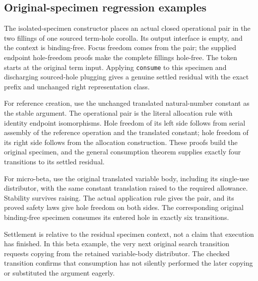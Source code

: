 \subsection{Original-specimen regression examples}
The isolated-specimen constructor places an actual closed operational pair
in the two fillings of one sourced term-hole corolla. Its output interface
is empty, and the context is binding-free. Focus freedom comes from the
pair; the supplied endpoint hole-freedom proofs make the complete fillings
hole-free. The token starts at the original term input. Applying
\texttt{consume} to this specimen and discharging sourced-hole plugging
gives a genuine settled residual with the exact prefix and unchanged right
representation class.


For reference creation, use the unchanged translated natural-number
constant as the stable argument. The operational pair is the literal
allocation rule with identity endpoint isomorphisms. Hole freedom of its
left side follows from serial assembly of the reference operation and
the translated constant; hole freedom of its right side follows from the
allocation construction. These proofs build the original specimen, and
the general consumption theorem supplies exactly four transitions to its
settled residual.


For micro-beta, use the original translated variable body, including its
single-use distributor, with the same constant translation raised to the
required allowance. Stability survives raising. The actual application
rule gives the pair, and its proved safety laws give hole freedom on both
sides. The corresponding original binding-free specimen consumes its
entered hole in exactly six transitions.


Settlement is relative to the residual specimen context, not a claim that
execution has finished. In this beta example, the very next original
search transition requests copying from the retained variable-body
distributor. The checked transition confirms that consumption has not
silently performed the later copying or substituted the argument eagerly.

